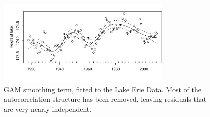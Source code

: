 \documentclass[12pt, a4paper,  BCOR=8.25mm, DIV=15]{scrartcl}\usepackage[]{graphicx}\usepackage[]{color}
\newenvironment{knitrout}{}{} %
\begin{document}
\begin{figure}
\begin{knitrout}
\color{fgcolor}

{\centering \includegraphics[width=0.75\textwidth]{figs/xmeth-gamErie-12_6-1} 

}



\end{knitrout}
\caption{GAM smoothing term, fitted to the Lake Erie Data.
    Most of the autocorrelation structure has been
    removed, leaving residuals that are very nearly independent.
  }\label{lh-smoothplot}
\end{figure}
\end{document}
